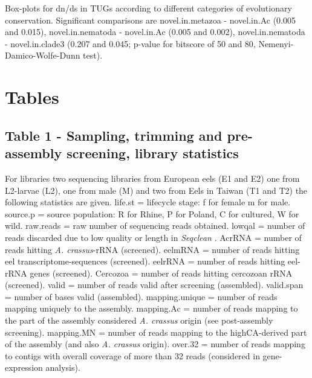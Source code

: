 \documentclass[10pt]{bmc_article}
\newenvironment{bmcformat}{\begin{raggedright}\baselineskip20pt\sloppy\setboolean{publ}{false}}{\end{raggedright}\baselineskip20pt\sloppy}
\begin{document}
\begin{bmcformat}
Box-plots for dn/ds in TUGs according to different categories of
evolutionary conservation. Significant comparisons are
novel.in.metazoa - novel.in.Ac (0.005 and 0.015), novel.in.nematoda -
novel.in.Ac (0.005 and 0.002), novel.in.nematoda - novel.in.clade3
(0.207 and 0.045; p-value for bitscore of 50 and 80,
Nemenyi-Damico-Wolfe-Dunn test).

\newpage

\section*{Tables}
\subsection*{Table 1 - Sampling, trimming and pre-assembly screening,
  library statistics}

For libraries two sequencing libraries from European eels (E1 and E2)
one from L2-larvae (L2), one from male (M) and two from Eels in Taiwan
(T1 and T2) the following statistics are given. life.st = lifecycle
stage: f for female m for male. source.p = source population: R for
Rhine, P for Poland, C for cultured, W for wild. raw.reads = raw
number of sequencing reads obtained. lowqal = number of reads
discarded due to low quality or length in \textit{Seqclean}
\cite{tgicl_pertea}. AcrRNA = number of reads hitting
\textit{A. crassus}-rRNA (screened). eelmRNA = number of reads hitting
eel transcriptome-sequences (screened). eelrRNA = number of reads
hitting eel-rRNA genes (screened). Cercozoa = number of reads hitting
cercozoan rRNA (screened). valid = number of reads valid after
screening (assembled). valid.span = number of bases valid (assembled).
mapping.unique = number of reads mapping uniquely to the
assembly. mapping.Ac = number of reads mapping to the part of the
assembly considered \textit{A. crassus} origin (see post-assembly
screening). mapping.MN = number of reads mapping to the highCA-derived
part of the assembly (and also \textit{A. crassus} origin). over.32 =
number of reads mapping to contigs with overall coverage of more than
32 reads (considered in gene-expression analysis).


\end{bmcformat}
\end{document}
